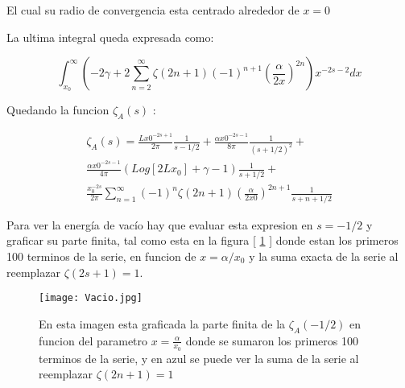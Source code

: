El cual su radio de convergencia esta centrado alrededor de $x = 0$

La ultima integral queda expresada como:

\begin{equation}
\int _{x_0} ^{\infty}
\left(
-2 \gamma + 
2 \sum _{n=2} ^{\infty}
\zeta (2n+1) (-1) ^{n+1}
( \frac{\alpha}{2 x} ) ^{2n}
\right)
x ^{-2s-2} dx
\end{equation}

Quedando la funcion $\zeta _A (s) $ :

\begin{equation}
\begin{array}{c}
\zeta _A (s) = 
\frac{L x0 ^{-2s+1} }{2 \pi } \frac{1}{s- 1/2} + 
\frac{\alpha x0 ^{-2s-1} }{8 \pi } \frac{1}{(s+1/2) ^2} + \\
\frac{\alpha x0 ^{-2s-1} }{4 \pi } 
\left(
Log[2 L x_0] + \gamma - 1
\right)
\frac{1}{s+1/2} + \\
\frac{x_0 ^{-2s}}{2\pi} 
\sum _{n=1} ^{\infty} (-1) ^{n} \zeta (2n+1) 
( \frac{\alpha}{2 x0} ) ^{2n+1} \frac{1}{s+n+1/2}
\end{array}
\end{equation}

Para ver la energía de vacío hay que evaluar esta expresion en $s=-1/2$ y graficar su parte finita, tal como esta en la figura [ \ref{fig:vacio} ] donde estan los primeros 100 terminos de la serie, en funcion de $x = \alpha / x_0$ y la suma exacta de la serie al reemplazar $\zeta (2s+1) = 1$.

\begin{figure}
    \centering
    \texttt{[image: Vacio.jpg]}
    \caption{En esta imagen esta graficada la parte finita de la $\zeta _A (-1/2) $ en funcion del parametro $x= \frac{\alpha}{x _0}$ donde se sumaron los primeros 100 terminos de la serie, y en azul se puede ver la suma de la serie al reemplazar $\zeta (2n+1) = 1$}
    \label{fig:vacio}
\end{figure}
